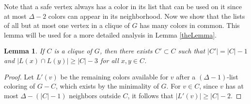\documentclass[12pt]{article}
\newtheorem{lemma}[theorem]{Lemma}
\theoremstyle{definition}
\begin{document}
Note that a safe vertex always has a color in its list that can be used on it since at most $\Delta-2$ colors can appear in its neighborhood.
Now we show that the lists of all but at most one vertex in a clique of $G$ has many colors in common. 
This lemma will be used for a more detailed analysis in Lemma \ref{theLemma}.

\begin{lemma}\label{core}
If $C$ is a clique of $G$, then there exists $C'\subset C$ such that $|C'|=|C|-1$ and $|L(x)\cap L(y)|\geq |C|-3$ for all $x, y\in C$.
\end{lemma}

\begin{proof}
Let $L'(v)$ be the remaining colors available for $v$ after a $(\Delta-1)$-list coloring of $G-C$, which exists by the minimality of $G$. 
For $v\in C$, since $v$ has at most $\Delta-(|C|-1)$ neighbors outside $C$, it follows that $|L'(v)|\geq |C|-2$.

%



\end{proof}
\end{document}
